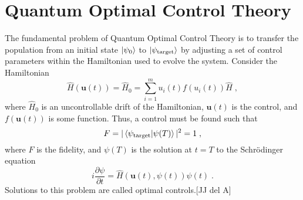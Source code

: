 \chapter{Quantum Optimal Control Theory}
The fundamental problem of Quantum Optimal Control Theory is to transfer the population from an initial state $\ket{\psi_0}$ to $\ket{\psi_{\mathrm{target}}}$ by adjusting a set of control parameters within the Hamiltonian used to evolve the system. Consider the Hamiltonian
\begin{equation}
	\hat{H}(\boldsymbol{u}(t)) = \hat{H}_0 = \sum_{i = 1}^{m} u_i(t) f(u_i(t)) \hat{H} \; ,
\end{equation} 
where $\hat{H}_0$ is an uncontrollable drift of the Hamiltonian, $\boldsymbol{u}(t)$ is the control, and $f(\boldsymbol{u}(t))$ is some function. Thus, a control must be found such that 
\begin{equation}
	F = |\braket{\psi_{\mathrm{target}} | \psi (T)}|^2 = 1 \; ,
\end{equation}
where $F$ is the fidelity, and $\psi (T)$ is the solution at $t = T$ to the Schrödinger equation 
\begin{equation}
	i \frac{\partial \psi}{\partial t} = \hat{H} \left( \boldsymbol{u}(t),\psi (t) \right) \psi (t) \; .
\end{equation}
Solutions to this problem are called optimal controls.[JJ del A]


